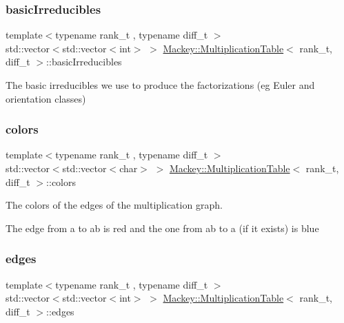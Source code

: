 \subsubsection{\texorpdfstring{basic\+Irreducibles}{basicIrreducibles}}
{\footnotesize\ttfamily template$<$typename rank\+\_\+t , typename diff\+\_\+t $>$ \\
std\+::vector$<$std\+::vector$<$int$>$ $>$ \hyperlink{classMackey_1_1MultiplicationTable}{Mackey\+::\+Multiplication\+Table}$<$ rank\+\_\+t, diff\+\_\+t $>$\+::basic\+Irreducibles\hspace{0.3cm}{\ttfamily [protected]}}



The basic irreducibles we use to produce the factorizations (eg Euler and orientation classes) 

\mbox{\label{classMackey_1_1MultiplicationTable_a11dcad2d104dfd310c8d3439fa00a4ce}} 
\subsubsection{\texorpdfstring{colors}{colors}}
{\footnotesize\ttfamily template$<$typename rank\+\_\+t , typename diff\+\_\+t $>$ \\
std\+::vector$<$std\+::vector$<$char$>$ $>$ \hyperlink{classMackey_1_1MultiplicationTable}{Mackey\+::\+Multiplication\+Table}$<$ rank\+\_\+t, diff\+\_\+t $>$\+::colors\hspace{0.3cm}{\ttfamily [protected]}}



The colors of the edges of the multiplication graph. 

The edge from a to ab is red and the one from ab to a (if it exists) is blue \mbox{\label{classMackey_1_1MultiplicationTable_a3e1f526da86649b8a41465d27395d04b}} 
\subsubsection{\texorpdfstring{edges}{edges}}
{\footnotesize\ttfamily template$<$typename rank\+\_\+t , typename diff\+\_\+t $>$ \\
std\+::vector$<$std\+::vector$<$int$>$ $>$ \hyperlink{classMackey_1_1MultiplicationTable}{Mackey\+::\+Multiplication\+Table}$<$ rank\+\_\+t, diff\+\_\+t $>$\+::edges\hspace{0.3cm}{\ttfamily [protected]}}



